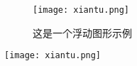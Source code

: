 \documentclass[UTF8]{ctexart}
\begin{document}
\pagestyle{plain}
\lipsum[1] %

\begin{figure}[htbp]%
    \centering
    \texttt{[image: xiantu.png]} %
    \caption{这是一个浮动图形示例}
    \label{fig:example}
\end{figure}
\vspace{2\baselineskip}%

\begin{center}
\texttt{[image: xiantu.png]} %
\end{center}

\lipsum[2] %
\end{document}
